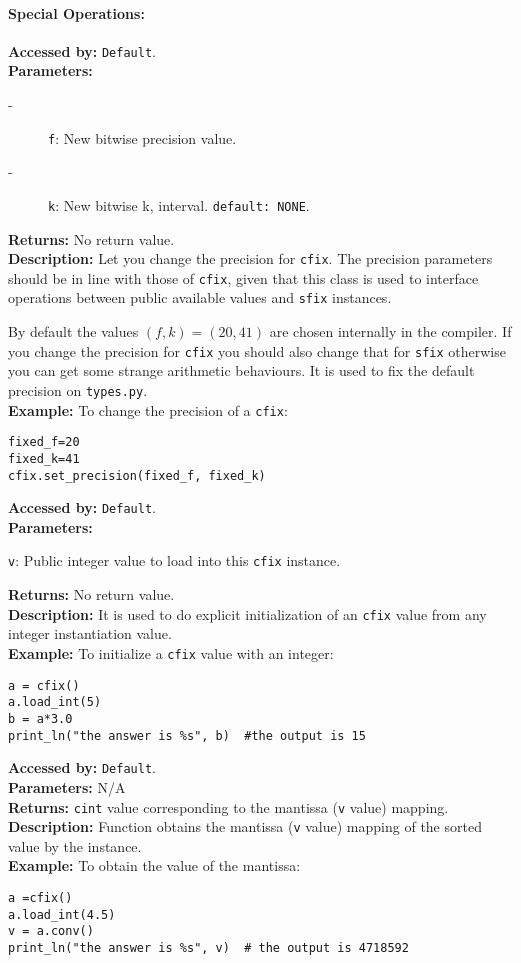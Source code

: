 \paragraph {Special Operations:}

\textbf{Accessed by:} \verb|Default|.\\
\textbf{Parameters:}
\begin{description}
  \item[-] \verb|f|: New bitwise precision value.
  \item[-] \verb|k|: New bitwise k, interval. \verb|default: NONE|.
\end{description}
\textbf{Returns:} No return value. \\
\textbf{Description:}
Let you change the precision for \verb|cfix|. The precision parameters should be in line with those of \verb|cfix|, given that this class is used to interface operations between public available values and \verb|sfix| instances.

By default the values $(f,k)=(20,41)$ are chosen internally in the compiler.
If you change the precision for \verb|cfix| you should also change that for
\verb|sfix| otherwise you can get some strange arithmetic behaviours.
It is used to fix the default precision on \verb|types.py|. \\
\textbf{Example:}
To change the precision of a \verb|cfix|:
\begin{lstlisting}
fixed_f=20
fixed_k=41
cfix.set_precision(fixed_f, fixed_k)
\end{lstlisting}

\textbf{Accessed by:} \verb|Default|.		 \\
\textbf{Parameters:}
\begin{description}
  \item \verb|v|: Public integer value to load into this \verb|cfix| instance.
\end{description}
\textbf{Returns:} No return value. \\
\textbf{Description:}
It is used to do explicit initialization of an \verb|cfix| value from any integer instantiation value. \\
\textbf{Example:}
To initialize a \verb|cfix| value with an integer:
\begin{lstlisting}
a = cfix()
a.load_int(5)
b = a*3.0
print_ln("the answer is %s", b)  #the output is 15
\end{lstlisting}
\textbf{Accessed by:} \verb|Default|.		 \\
\textbf{Parameters:} N/A \\
\textbf{Returns:} \verb|cint| value corresponding to the mantissa (\verb|v| value) mapping. \\
\textbf{Description:}
Function obtains the mantissa (\verb|v| value) mapping of the sorted value by the instance. \\
\textbf{Example:}
To obtain the value of the mantissa:
\begin{lstlisting}
a =cfix()
a.load_int(4.5)
v = a.conv()
print_ln("the answer is %s", v)  # the output is 4718592
\end{lstlisting}


